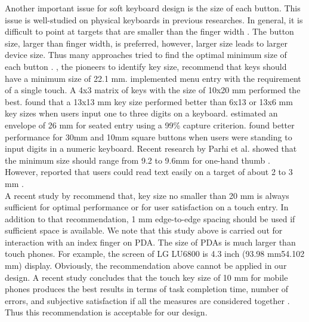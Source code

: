 \documentclass{singlecol-new}
\theoremstyle{TH}{
\newtheorem{lemma}{Lemma}
\newtheorem{theorem}[lemma]{Theorem}
\newtheorem{corrolary}[lemma]{Corrolary}
\newtheorem{conjecture}[lemma]{Conjecture}
\newtheorem{proposition}[lemma]{Proposition}
\newtheorem{claim}[lemma]{Claim}
\newtheorem{stheorem}[lemma]{Wrong Theorem}
\newtheorem{algorithm}{Algorithm}
}
\theoremstyle{THrm}{
\newtheorem{definition}{Definition}[section]
\newtheorem{question}{Question}[section]
\newtheorem{remark}{Remark}
\newtheorem{scheme}{Scheme}
}
\theoremstyle{THhit}{
\newtheorem{case}{Case}[section]
}
\begin{document}
Another important issue for soft keyboard design is the size of each button. This issue is well-studied on physical keyboards in previous researches. In general, it is difficult to point at targets that are smaller than the finger width \citep{albinsson2003high}. The button size, larger than finger width, is preferred, however, larger size leads to larger device size. Thus many approaches tried to find the optimal minimum size of each button \citep{beringer1990target, hall1988factors}. \citet{pfauth1981person}, the pioneers to identify key size, recommend that keys should have a minimum size of 22.1 mm. \citet{beaton1985effects} implemented menu entry with the requirement of a single touch. A 4x3 matrix of keys with the size of 10x20 mm performed the best. \citet{martin1988configuring}found that a 13x13 mm key size performed better than 6x13 or 13x6 mm key sizes when users input one to three digits on a keyboard. \citet{sears1991improving}estimated an envelope of 26 mm for seated entry using a 99\% capture criterion. \citet{bender1999touch} found better performance for 30mm and 10mm square buttons when users were standing to input digits in a numeric keyboard. Recent research by Parhi et al. showed that the minimum size should range from 9.2 to 9.6mm for one-hand thumb \citep{parhi2006target}. However, \citet{darroch2005effect} reported that users could read text easily on a target of about 2 to 3 mm .\\

A recent study by \citet{colle2004standing} recommend that, key size no smaller than 20 mm is always sufficient for optimal performance or for user satisfaction on a touch entry. In addition to that recommendation, 1 mm edge-to-edge spacing should be used if sufficient space is available. We note that this study above is carried out for interaction with an index finger on PDA. The size of PDAs is much larger than touch phones. For example, the screen of LG LU6800 is 4.3 inch (93.98 mm54.102 mm) display. Obviously, the recommendation above cannot be applied in our design. A recent study concludes that the touch key size of 10 mm for mobile phones produces the best results in terms of task completion time, number of errors, and subjective satisfaction if all the measures are considered together \citep{park2010touch}. Thus this recommendation is acceptable for our design.\\
\end{document}
